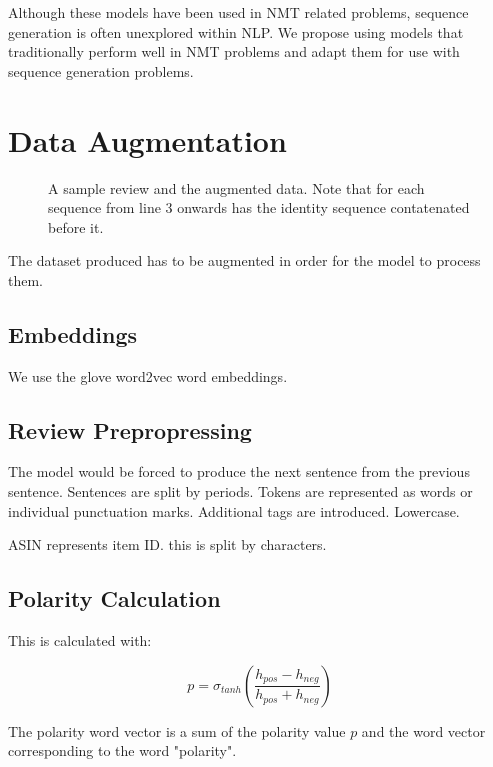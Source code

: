 \documentclass[12pt,twoside]{report}
\begin{document}
Although these models have been used in NMT related problems, sequence generation is often unexplored within NLP. We propose using models that traditionally perform well in NMT problems and adapt them for use with sequence generation problems. 

\section{Data Augmentation}

\begin{figure}[!ht]
\centering


\caption{A sample review and the augmented data. Note that for each sequence from line 3 onwards has the identity sequence contatenated before it. \label{aug_1}}
\end{figure}

The dataset produced has to be augmented in order for the model to process them. 

\subsection{Embeddings}

We use the glove word2vec word embeddings.

\subsection{Review Prepropressing}

The model would be forced to produce the next sentence from the previous sentence. Sentences are split by periods. Tokens are represented as words or individual punctuation marks. Additional tags are introduced. Lowercase. 

ASIN represents item ID. this is split by characters.

\subsection{Polarity Calculation}

This is calculated with:

\begin{equation}
p = \sigma_{tanh}(\frac{h_{pos} - h_{neg}}{h_{pos} + h_{neg}})
\end{equation}

The polarity word vector is a sum of the polarity value $p$ and the word vector corresponding to the word "polarity".
\end{document}
